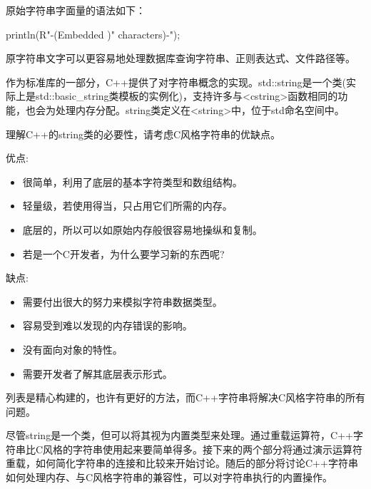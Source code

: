 原始字符串字面量的语法如下：

\begin{cpp}
println(R"-(Embedded )" characters)-");
\end{cpp}

原字符串文字可以更容易地处理数据库查询字符串、正则表达式、文件路径等。


作为标准库的一部分，C++提供了对字符串概念的实现。std::string是一个类(实际上是std::basic\_string类模板的实例化)，支持许多与<cstring>函数相同的功能，也会为处理内存分配。string类定义在<string>中，位于std命名空间中。


理解C++的string类的必要性，请考虑C风格字符串的优缺点。

优点:

\begin{itemize}
\item
很简单，利用了底层的基本字符类型和数组结构。

\item
轻量级，若使用得当，只占用它们所需的内存。

\item
底层的，所以可以如原始内存般很容易地操纵和复制。

\item
若是一个C开发者，为什么要学习新的东西呢?
\end{itemize}

缺点:

\begin{itemize}
\item
需要付出很大的努力来模拟字符串数据类型。

\item
容易受到难以发现的内存错误的影响。

\item
没有面向对象的特性。

\item
需要开发者了解其底层表示形式。
\end{itemize}

列表是精心构建的，也许有更好的方法，而C++字符串将解决C风格字符串的所有问题。


尽管string是一个类，但可以将其视为内置类型来处理。通过重载运算符，C++字符串比C风格的字符串使用起来要简单得多。接下来的两个部分将通过演示运算符重载，如何简化字符串的连接和比较来开始讨论。随后的部分将讨论C++字符串如何处理内存、与C风格字符串的兼容性，可以对字符串执行的内置操作。

